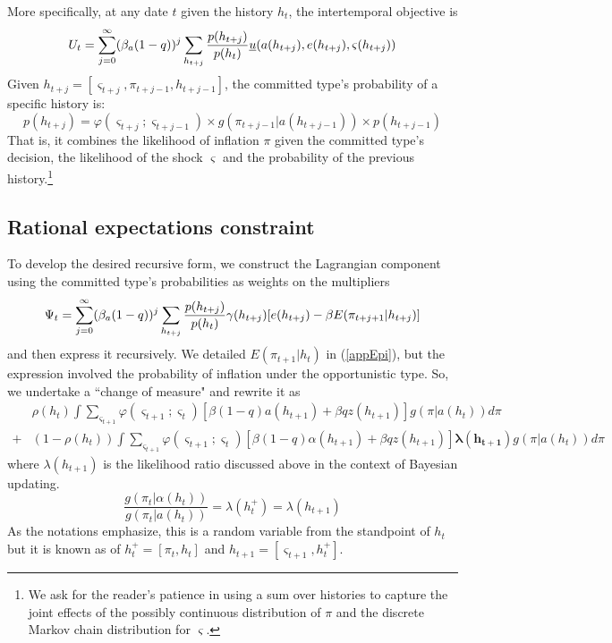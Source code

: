 \documentclass[12pt,letter,leqno]{article}
\theoremstyle{asn}
\theoremstyle{lem}
\theoremstyle{slem}
\theoremstyle{prop}
\theoremstyle{appprop}
\theoremstyle{rem}
\theoremstyle{defn}
\begin{document}
More specifically, at any date $t$ given the history $h_{t}$, the intertemporal objective is
\begin{equation}
U_{t}=\sum_{j=0}^{\infty }(\beta_{a}(1-q))^{j}\sum_{h_{t+j}}\frac{p(h_{t+j})%
}{p(h_{t})}\uline{u}(a(h_{t+j}),e(h_{t+j}),\varsigma (h_{t+j}))
\label{app:intertemporal objective}
\end{equation}%
Given $h_{t+j}=[\varsigma _{t+j},\pi _{t+j-1},h_{t+j-1}]$, the committed type's probability of a specific history is:
\begin{equation}
p(h_{t+j})=\varphi (\varsigma _{t+j};\varsigma_{t+j-1})\times g(\pi
_{t+j-1}|a(h_{t+j-1}))\times p(h_{t+j-1})  \label{app:prob h evolution}
\end{equation}%
That is, it combines the likelihood of inflation $\pi $ given the committed type's
decision, the likelihood of the shock $\varsigma $ and the probability of
the previous history.\footnote{%
We ask for the reader's patience in using a sum over histories to capture
the joint effects of the possibly continuous distribution of $\pi $ and the
discrete Markov chain distribution for $\varsigma $.}

\subsection{Rational expectations constraint}\label{appsec:recursive7}

To develop the desired recursive form, we construct the Lagrangian component using the committed type's probabilities as weights on the multipliers
\begin{equation}
\Psi_t=\sum_{j=0}^{\infty }(\beta_{a}(1-q))^{j}\sum_{h_{t+j}}\frac{p(h_{t+j})}{%
p(h_{t})}\gamma (h_{t+j})[e(h_{t+j})-\beta E(\pi _{t+j+1}|h_{t+j})]\label{PSI}
\end{equation}%
and then express it recursively. We detailed $ E(\pi _{t+1}|h_{t})$ in (\ref{appEpi}), but the expression involved the probability of inflation under the opportunistic type. So, we undertake a ``change of measure" and rewrite it as 
\begin{align}
&\rho (h_{t})\int \sum_{\varsigma _{t+1}}\varphi
(\varsigma_{t+1};\varsigma_{t})
[\beta (1-q)a(h_{t+1})+\beta qz(h_{t+1})]
g(\pi |a(h_{t}))d\pi  \label{eq:Epi1} \\
+&(1-\rho (h_{t}))\int \sum_{\varsigma _{t+1}}\varphi (\varsigma_{t+1};\varsigma_{t})
[\beta (1-q)\alpha (h_{t+1})+\beta qz(h_{t+1})]
\mathbf{\lambda(h_{t+1})}g(\pi |a(h_{t}))d\pi  \nonumber
\end{align}
where $\lambda(h_{t+1})$ is the likelihood ratio discussed above in the context of Bayesian updating. 
\begin{equation}
\frac{g(\pi _{t}|\alpha (h_{t}))}{g(\pi _{t}|a(h_{t}))}=\lambda
(h_{t}^{+})=\lambda (h_{t+1})\label{LRlambda}
\end{equation}%
As the notations emphasize, this is a random variable from the standpoint of $%
h_{t}$ but it is known as of $h_{t}^{+}=[\pi _{t},h_{t}]$ and $%
h_{t+1}=[\varsigma _{t+1},h_{t}^{+}]$. 
\end{document}
